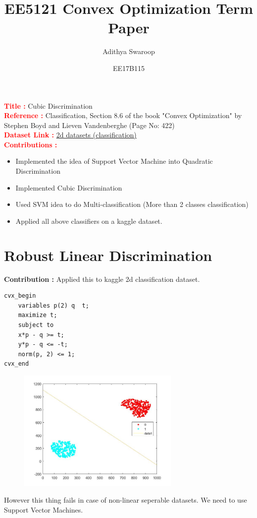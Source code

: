 \documentclass{article}
\title{EE5121 Convex Optimization Term Paper }
\author{Adithya Swaroop}
\date{EE17B115}
\begin{document}
\maketitle

\textcolor{red}{\textbf{Title :}} Cubic Discrimination \\

\textcolor{red}{\textbf{Reference :}} Classification, Section 8.6 of the book "Convex Optimization" by Stephen Boyd and Lieven Vandenberghe (Page No: 422) \\

\textcolor{red}{\textbf{Dataset Link :}} \href{https://www.kaggle.com/kalinin84/2d-datasets-classification}{2d datasets (classification)}\\

\textcolor{red}{\textbf{Contributions :}}
\begin{itemize}
    \item Implemented the idea of Support Vector Machine into Quadratic Discrimination 
    \item Implemented Cubic Discrimination
    \item Used SVM idea to do Multi-classification (More than 2 classes classification)
    \item Applied all above classifiers on a kaggle dataset.
\end{itemize}

\newpage

\section{Robust Linear Discrimination}
\textbf{Contribution : } Applied this to kaggle 2d classification dataset.
\begin{verbatim}
cvx_begin
    variables p(2) q  t;
    maximize t;
    subject to
    x*p - q >= t;
    y*p - q <= -t;
    norm(p, 2) <= 1;
cvx_end
\end{verbatim}
\begin{figure}[h!]
    \includegraphics[width=0.7\textwidth, center ]{data1.jpg}
\end{figure}
However this thing fails in case of non-linear seperable datasets. We need to use Support Vector Machines.
\end{document}
